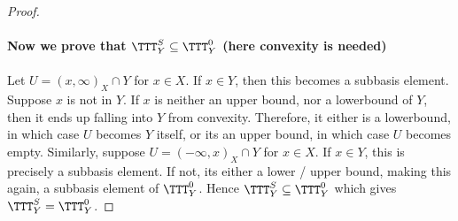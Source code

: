 \documentclass[main.tex]{subfiles}
\begin{document}
{\begin{proof}
    \\\\ \textbf{Now we prove that $\TTT^S_Y \subseteq \TTT^0_Y$ (here convexity is needed) }
    \\\\ Let $U=(x,\infty)_X\cap Y$ for $x \in X$. If $x \in Y$, then this becomes a subbasis element. Suppose $x$ is not in $Y$. If $x$ is neither an upper bound, nor a lowerbound of $Y$, then it ends up falling into $Y$ from convexity. Therefore, it either is a lowerbound, in which case $U$ becomes $Y$ itself, or its an upper bound, in which case $U$ becomes empty. Similarly, suppose $U=(-\infty,x)_X \cap Y$ for $x \in X$. If $x \in Y$, this is precisely a subbasis element. If not, its either a lower / upper bound, making this again, a subbasis element of $\TTT^0_Y$. Hence $\TTT^S_Y \subseteq \TTT^0_Y$ which gives $\TTT^S_Y =\TTT^0_Y$.
    
    
    \end{proof}
} 
\end{document}
